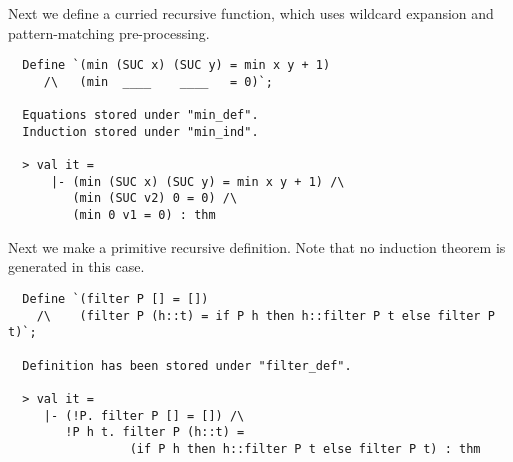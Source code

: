 Next we define a curried recursive function, which uses
wildcard expansion and pattern-matching pre-processing.
%
\begin{hol}
\begin{verbatim}
  Define `(min (SUC x) (SUC y) = min x y + 1)
     /\   (min  ____    ____   = 0)`;

  Equations stored under "min_def".
  Induction stored under "min_ind".

  > val it =
      |- (min (SUC x) (SUC y) = min x y + 1) /\
         (min (SUC v2) 0 = 0) /\
         (min 0 v1 = 0) : thm
\end{verbatim}
\end{hol}
 
 Next we make a primitive recursive definition. Note that no
induction theorem is generated in this case.
%
\begin{hol}
\begin{verbatim}
  Define `(filter P [] = [])
    /\    (filter P (h::t) = if P h then h::filter P t else filter P t)`;

  Definition has been stored under "filter_def".

  > val it =
     |- (!P. filter P [] = []) /\
        !P h t. filter P (h::t) =
                 (if P h then h::filter P t else filter P t) : thm
\end{verbatim}
\end{hol}
 
